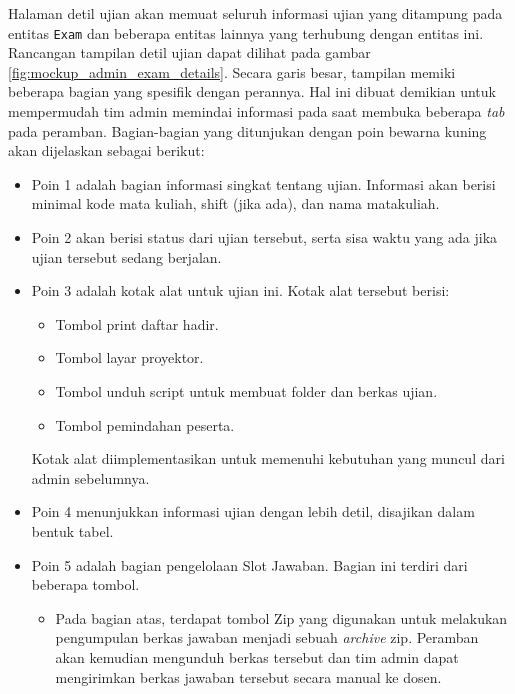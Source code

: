     Halaman detil ujian akan memuat seluruh informasi ujian yang ditampung pada
    entitas \texttt{Exam} dan beberapa entitas lainnya yang terhubung dengan
    entitas ini. Rancangan tampilan detil ujian dapat dilihat pada gambar
    \ref{fig:mockup_admin_exam_details}. Secara garis besar, tampilan memiki
    beberapa bagian yang spesifik dengan perannya. Hal ini dibuat demikian untuk
    mempermudah tim admin memindai informasi pada saat membuka beberapa
    \textit{tab} pada peramban. Bagian-bagian yang ditunjukan dengan poin
    bewarna kuning akan dijelaskan sebagai berikut:
    \begin{itemize}
        \item Poin 1 adalah bagian informasi singkat tentang ujian. Informasi
            akan berisi minimal kode mata kuliah, shift (jika ada), dan nama
            matakuliah.
            
        \item Poin 2 akan berisi status dari ujian tersebut, serta sisa waktu
            yang ada jika ujian tersebut sedang berjalan.
            
        \item Poin 3 adalah kotak alat untuk ujian ini. Kotak alat tersebut
        berisi:
            \begin{itemize}
                \item Tombol print daftar hadir.
                \item Tombol layar proyektor.
                \item Tombol unduh script untuk membuat folder dan berkas ujian.
                \item Tombol pemindahan peserta.
            \end{itemize}
            Kotak alat diimplementasikan untuk memenuhi kebutuhan yang muncul
            dari admin sebelumnya.
            
        \item Poin 4 menunjukkan informasi ujian dengan lebih detil, disajikan
        dalam bentuk tabel.
        
        \item Poin 5 adalah bagian pengelolaan Slot Jawaban. Bagian ini terdiri
        dari beberapa tombol.
            \begin{itemize}
                \item Pada bagian atas, terdapat tombol Zip yang digunakan untuk
                    melakukan pengumpulan berkas jawaban menjadi sebuah
                    \textit{archive} zip. Peramban akan kemudian mengunduh
                    berkas tersebut dan tim admin dapat mengirimkan berkas
                    jawaban tersebut secara manual ke dosen.
                    

\end{itemize}
\end{itemize}
